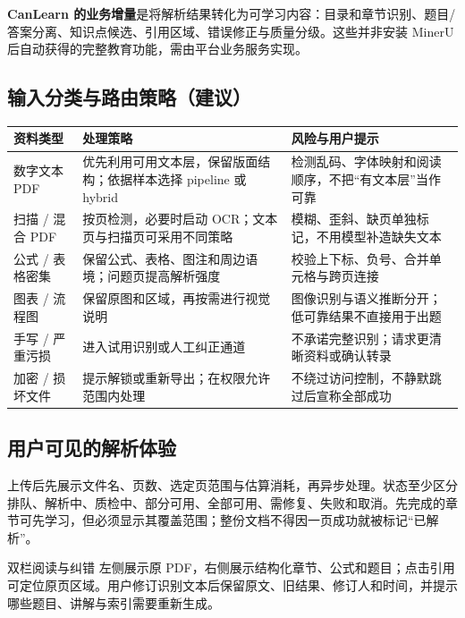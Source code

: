 \documentclass[UTF8,a4paper,11pt,fontset=none]{ctexart}
\newcommand{\cth}[1]{\textbf{\sffamily #1}}
\newcommand{\cont}[1]{\clearpage\noindent{\small\sffamily\color{Muted}#1}\par\vspace{3pt}}
\newenvironment{tbl}{\par\vspace{3pt}\small\noindent\ignorespaces}{\unskip\par\vspace{5pt}}
\begin{document}
\textbf{CanLearn 的业务增量}是将解析结果转化为可学习内容：目录和章节识别、题目/答案分离、知识点候选、引用区域、错误修正与质量分级。这些并非安装 MinerU 后自动获得的完整教育功能，需由平台业务服务实现。

\subsection{输入分类与路由策略（建议）}
\begin{tbl}
\begin{tabularx}{\linewidth}{@{}L{27mm}YY@{}}
\toprule
\cth{资料类型}&\cth{处理策略}&\cth{风险与用户提示}\\\midrule
数字文本 PDF&优先利用可用文本层，保留版面结构；依据样本选择 pipeline 或 hybrid&检测乱码、字体映射和阅读顺序，不把“有文本层”当作可靠\\
扫描 / 混合 PDF&按页检测，必要时启动 OCR；文本页与扫描页可采用不同策略&模糊、歪斜、缺页单独标记，不用模型补造缺失文本\\
公式 / 表格密集&保留公式、表格、图注和周边语境；问题页提高解析强度&校验上下标、负号、合并单元格与跨页连接\\
图表 / 流程图&保留原图和区域，再按需进行视觉说明&图像识别与语义推断分开；低可靠结果不直接用于出题\\
手写 / 严重污损&进入试用识别或人工纠正通道&不承诺完整识别；请求更清晰资料或确认转录\\
加密 / 损坏文件&提示解锁或重新导出；在权限允许范围内处理&不绕过访问控制，不静默跳过后宣称全部成功\\
\bottomrule
\end{tabularx}
\end{tbl}

\subsection{用户可见的解析体验}
上传后先展示文件名、页数、选定页范围与估算消耗，再异步处理。状态至少区分排队、解析中、质检中、部分可用、全部可用、需修复、失败和取消。先完成的章节可先学习，但必须显示其覆盖范围；整份文档不得因一页成功就被标记“已解析”。

\begin{insight}{双栏阅读与纠错}
左侧展示原 PDF，右侧展示结构化章节、公式和题目；点击引用可定位原页区域。用户修订识别文本后保留原文、旧结果、修订人和时间，并提示哪些题目、讲解与索引需要重新生成。
\end{insight}

\cont{8 / PDF 解析与内容识别（续）}
\end{document}
